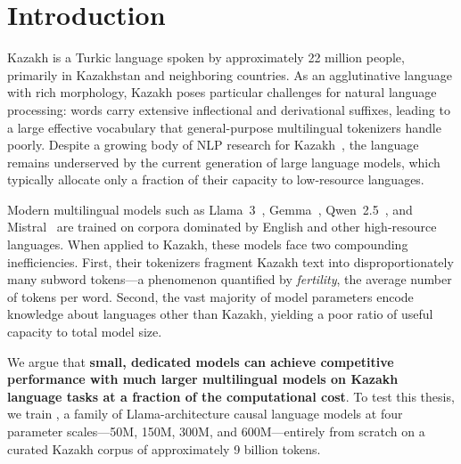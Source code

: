 \section{Introduction}

Kazakh is a Turkic language spoken by approximately 22 million people,
primarily in Kazakhstan and neighboring countries.  As an agglutinative
language with rich morphology, Kazakh poses particular challenges for
natural language processing: words carry extensive inflectional and
derivational suffixes, leading to a large effective vocabulary that
general-purpose multilingual tokenizers handle poorly.  Despite a
growing body of NLP research for Kazakh~\citep{yeshpanov2022kaznerd,
yeshpanov2024kazqad}, the language remains underserved by the current
generation of large language models, which typically allocate only a
fraction of their capacity to low-resource languages.

Modern multilingual models such as Llama~3~\citep{touvron2023llama},
Gemma~\citep{team2024gemma}, Qwen~2.5~\citep{bai2023qwen}, and
Mistral~\citep{jiang2023mistral} are trained on corpora dominated by
English and other high-resource languages.  When applied to Kazakh,
these models face two compounding inefficiencies.  First, their
tokenizers fragment Kazakh text into disproportionately many subword
tokens---a phenomenon quantified by \emph{fertility}, the average
number of tokens per word.  Second, the vast majority of model
parameters encode knowledge about languages other than Kazakh, yielding
a poor ratio of useful capacity to total model size.

We argue that \textbf{small, dedicated models can achieve competitive
performance with much larger multilingual models on Kazakh language
tasks at a fraction of the computational cost}.  To test this thesis, we train
\sozkz{}, a family of Llama-architecture causal language models at four
parameter scales---50M, 150M, 300M, and 600M---entirely from scratch on
a curated Kazakh corpus of approximately 9 billion tokens.

